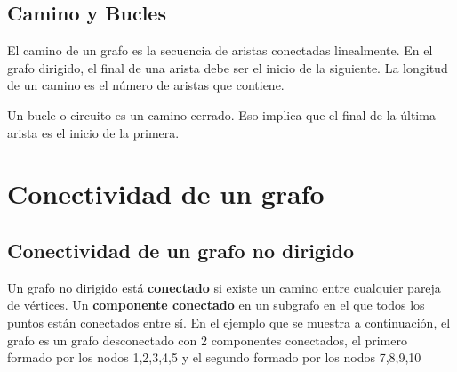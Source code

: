 \documentclass[11pt]{article}
\theoremstyle{plain}
\begin{document}
        \subsection{Camino y Bucles} %
        \label{sub:camino_y_bucles}
            El camino de un grafo es la secuencia de aristas conectadas linealmente. En el grafo dirigido, el final de una arista debe ser el inicio de la siguiente. La longitud de un camino es el número de aristas que contiene. 

            Un bucle o circuito es un camino cerrado. Eso implica que el final de la última arista es el inicio de la primera.
    \section{Conectividad de un grafo} %
    \label{sec:conectividad_de_un_grafo}
        \subsection{Conectividad de un grafo no dirigido} %
        \label{sub:conectividad_de_un_grafo_no_dirigido}
            Un grafo no dirigido está \textbf{conectado} si existe un camino entre cualquier pareja de vértices. Un \textbf{componente conectado} en un subgrafo en el que todos los puntos están conectados entre sí. En el ejemplo que se muestra a continuación, el grafo es un grafo desconectado con 2 componentes conectados, el primero formado por los nodos 1,2,3,4,5 y el segundo formado por los nodos 7,8,9,10\\
            \begin{center}
            \end{center}
            
\end{document}
